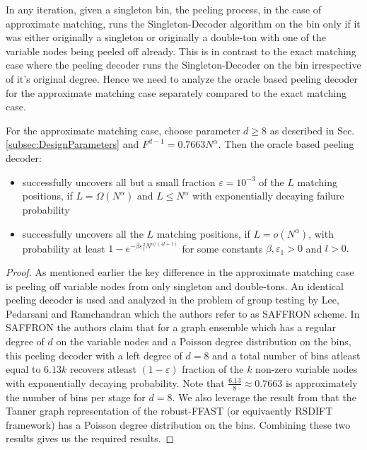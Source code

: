 In any iteration, given a singleton bin, the peeling process, in the case of approximate matching, runs the Singleton-Decoder algorithm on the bin only if it was either originally a singleton or originally a double-ton with one of the variable nodes being peeled off already. This is in contrast to the exact matching case where the peeling decoder runs the Singleton-Decoder on the bin irrespective of it's original degree. Hence we need to analyze the oracle based peeling decoder for the approximate matching case separately compared to the exact matching case. 
\begin{lemma}
For the approximate matching case, choose parameter $d\geq 8$ as described in Sec. \ref{subsec:DesignParameters} and $F^{d-1}=0.7663 N^{\alpha}$. Then the oracle based peeling decoder: %
\begin{itemize}
\item successfully uncovers all but a small fraction $\varepsilon=10^{-3}$ of the $L$ matching positions, if $L=\Omega(N^{\alpha})$ and $L\leq N^{\alpha}$ with exponentially decaying failure probability
\item successfully uncovers all the $L$ matching positions, if $L=o(N^{\alpha})$, with probability at least $1-e^{-\beta \varepsilon_1^2N^{\alpha/(4l+1)}}$ for some constants $\beta,\varepsilon_1>0$ and $l>0.$
\end{itemize}
\end{lemma}
\begin{proof}
As mentioned earlier the key difference in the approximate matching case is peeling off variable nodes from only singleton and double-tons. An identical peeling decoder is used and analyzed in the problem of group testing \cite{lee2015saffron} by Lee, Pedarsani and Ramchandran which the authors refer to as SAFFRON scheme. In SAFFRON the authors claim that for a graph ensemble which has a regular degree of $d$ on the variable nodes and a  Poisson degree distribution on the bins, this peeling decoder with a left degree of $d=8$ and a total number of bins atleast equal to $6.13 k$ recovers atleast $(1-\varepsilon)$ fraction of the $k$ non-zero variable nodes with exponentially decaying probability. Note that $\frac{6.13}{8}\approx 0.7663$ is approximately the number of bins per stage for $d=8$. We also leverage the result from \cite{pawar2014robust} that the Tanner graph representation of the robust-FFAST (or equivaently RSDIFT framework) has a Poisson degree distribution on the bins. Combining these two results gives us the required results.
\end{proof}

